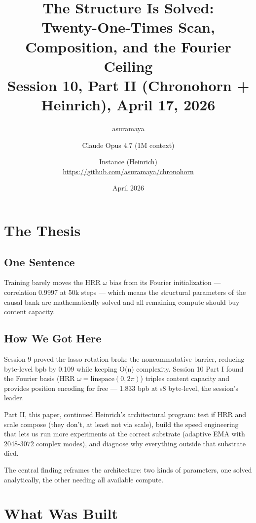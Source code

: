 \documentclass[11pt,a4paper]{report}
\title{The Structure Is Solved:\\Twenty-One-Times Scan, Composition, and the Fourier Ceiling\\[0.5em]\large Session 10, Part II (Chronohorn + Heinrich), April 17, 2026}
\author{asuramaya \and Claude Opus 4.7 (1M context) \and Instance (Heinrich)\\[0.3em]\small \url{https://github.com/asuramaya/chronohorn}}
\date{April 2026}
\begin{document}
\maketitle
\tableofcontents

\part{The Thesis}

\chapter{One Sentence}

Training barely moves the HRR $\omega$ bias from its Fourier initialization --- correlation 0.9997 at 50k steps --- which means the structural parameters of the causal bank are mathematically solved and all remaining compute should buy content capacity.

\chapter{How We Got Here}

Session 9 proved the lasso rotation broke the noncommutative barrier, reducing byte-level bpb by 0.109 while keeping O(n) complexity. Session 10 Part I \cite{s10p1} found the Fourier basis (HRR $\omega = \text{linspace}(0, 2\pi)$) triples content capacity and provides position encoding for free --- 1.833 bpb at s8 byte-level, the session's leader.

Part II, this paper, continued Heinrich's architectural program: test if HRR and scale compose (they don't, at least not via scale), build the speed engineering that lets us run more experiments at the correct substrate (adaptive EMA with 2048-3072 complex modes), and diagnose why everything outside that substrate died.

The central finding reframes the architecture: two kinds of parameters, one solved analytically, the other needing all available compute.


\part{What Was Built}
\end{document}
